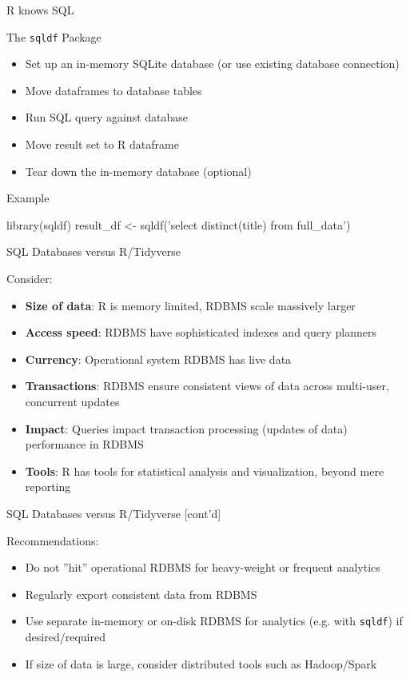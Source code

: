 \documentclass[ignorenonframetext,xcolor=x11names]{beamer}
\begin{document}
\begin{frame}[fragile]{R knows SQL}

\begin{block}{The \texttt{sqldf} Package}
  \begin{itemize}
     \item Set up an in-memory SQLite database (or use existing database connection)
     \item Move dataframes to database tables
     \item Run SQL query against database
     \item Move result set to R dataframe
     \item Tear down the in-memory database (optional)
  \end{itemize}
\end{block}

\begin{block}{Example}
\small
\begin{Rcode}
library(sqldf)
result_df <- 
   sqldf('select distinct(title) from full_data')
\end{Rcode}
\end{block}
\end{frame}


\begin{frame}{SQL Databases versus R/Tidyverse}
\begin{block}{Consider:}
  \begin{itemize}
     \item \textbf{Size of data}: R is memory limited, RDBMS scale massively larger
     \item \textbf{Access speed}: RDBMS have sophisticated indexes and query planners
     \item \textbf{Currency}: Operational system RDBMS has live data
     \item \textbf{Transactions}: RDBMS ensure consistent views of data across multi-user, concurrent updates
     \item \textbf{Impact}: Queries impact transaction processing (updates of data) performance in RDBMS 
     \item \textbf{Tools}: R has tools for statistical analysis and visualization, beyond mere reporting
  \end{itemize}
\end{block}
\end{frame}

\begin{frame}{SQL Databases versus R/Tidyverse \small [cont'd]}
\begin{block}{Recommendations:}
  \begin{itemize}
     \item Do not ''hit'' operational RDBMS for heavy-weight or frequent analytics
     \item Regularly export consistent data from RDBMS
     \item Use separate in-memory or on-disk RDBMS for analytics (e.g. with \texttt{sqldf}) if desired/required
     \item If size of data is large, consider distributed tools such as Hadoop/Spark
  \end{itemize}
\end{block}
\end{frame}
\end{document}
